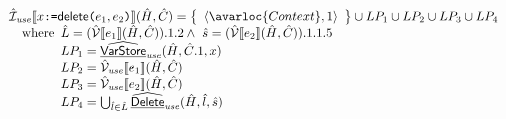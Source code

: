 \[\begin{array}{l}
  \aI_{\it use}\lbr x \TT{:=} \SF{delete}\TT{(}e_1,e_2\TT{)} \rbr(\hat{H},\hat{C})
  = \set{\langle \avarloc{Context}, 1\rangle} \cup LP_1 \cup LP_2\cup LP_3 \cup LP_4\\
  \quad\wherec{
    \hat{L}=(\aV\lbr e_1\rbr(\hat{H},\hat{C})).1.2
    \land\ \hat{s}=(\aV\lbr e_2\rbr(\hat{H},\hat{C})).1.1.5\\
    LP_1 = \ahf{VarStore}_{\it use}(\hat{H}, \hat{C}.1, x)\\
    LP_2 = \aV_{\it use}\lbr e_1\rbr(\hat{H},\hat{C})\\
    LP_3 = \aV_{\it use}\lbr e_2\rbr(\hat{H},\hat{C})\\
    LP_4 = \bigcup_{\hat{l}\in\hat{L}}\ahf{Delete}_{\it use}(\hat{H},\hat{l},\hat{s})
  }
  \\\\
\end{array}
\]
